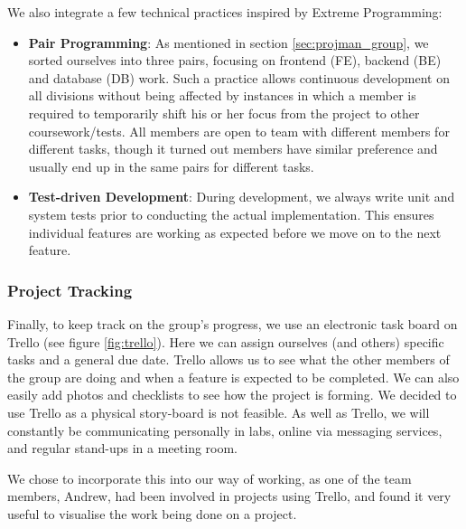 ﻿\documentclass[a4paper, titlepage]{article}
\begin{document}
We also integrate a few technical practices inspired by Extreme Programming:
\begin{itemize}
  \item \textbf{Pair Programming}: As mentioned in section \ref{sec:projman_group}, we sorted
        ourselves into three pairs, focusing on frontend (FE), backend (BE) and database (DB) work.
        Such a practice allows continuous development on all divisions without
        being affected by instances in which a member is required to temporarily shift his or her
        focus from the project to other coursework/tests. All members are open to team
        with different members for different tasks, though it turned out members have similar
        preference and usually end up in the same pairs for different tasks.
  \item \textbf{Test-driven Development}: During development, we always write unit and system tests prior to conducting the actual implementation. This ensures individual features are working as expected before we move on to the next feature.

\end{itemize} 

\subsubsection{Project Tracking} \label{sec:projman_tracking}

Finally, to keep track on the group's progress, we use an electronic task
board on Trello (see figure \ref{fig:trello}). Here we can assign ourselves (and others) specific tasks and a general due date. Trello allows us to see what the other members of the group are doing and when a feature is expected to be completed. We can also easily add photos and checklists to see how the project is forming. We decided to use Trello as a physical story-board is not feasible. As well as Trello, we will constantly be communicating personally in labs, online via messaging services, and regular stand-ups in a meeting room.

We chose to incorporate this into our way of working, as one of the team members, Andrew, had been involved in projects using Trello, and found it very useful to visualise the work being done on a project.
\end{document}
